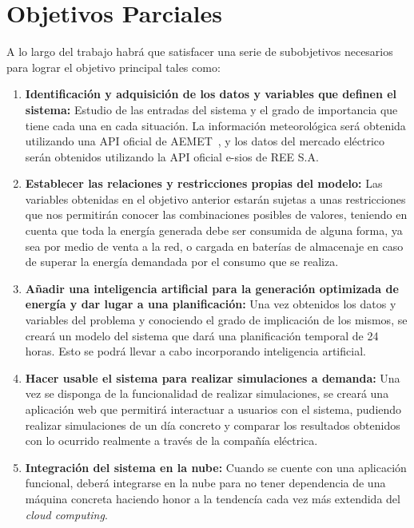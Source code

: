 \section{Objetivos Parciales}
A lo largo del trabajo habrá que satisfacer una serie de subobjetivos necesarios para lograr el objetivo principal tales como:
\begin{enumerate}
	\item \textbf{Identificación y adquisición de los datos y variables que definen el sistema:}
	Estudio de las entradas del sistema y el grado de importancia que tiene cada una en cada situación. La información meteorológica será obtenida utilizando una \gls{API} oficial de \gls{AEMET}~\cite{Aemet}, y los datos del mercado eléctrico serán obtenidos utilizando la \gls{API} oficial e-sios de \gls{REE} S.A.~\cite{Ree}

	\item \textbf{Establecer las relaciones y restricciones propias del modelo:}
	Las variables obtenidas en el objetivo anterior estarán sujetas a unas restricciones que nos permitirán conocer las combinaciones posibles de valores, teniendo en cuenta que toda la energía generada debe ser consumida de alguna forma, ya sea por medio de venta a la red, o cargada en baterías de almacenaje en caso de superar la energía demandada por el consumo que se realiza.

	\item \textbf{Añadir una inteligencia artificial para la generación optimizada de energía y dar lugar a una planificación:}
	Una vez obtenidos los datos y variables del problema y conociendo el grado de implicación de los mismos, se creará un modelo del sistema que dará una planificación temporal de 24 horas. Esto se podrá llevar a cabo incorporando inteligencia artificial.

      \item \textbf{Hacer usable el sistema para realizar simulaciones a demanda:}
        Una vez se disponga de la funcionalidad de realizar simulaciones, se creará una aplicación web que permitirá interactuar a usuarios con el sistema, pudiendo realizar simulaciones de un día concreto y comparar los resultados obtenidos con lo ocurrido realmente a través de la compañía eléctrica.

      \item \textbf{Integración del sistema en la nube:}
        Cuando se cuente con una aplicación funcional, deberá integrarse en la nube para no tener dependencia de una máquina concreta haciendo honor a la tendencía cada vez más extendida del \textit{cloud computing}.

\end{enumerate}
